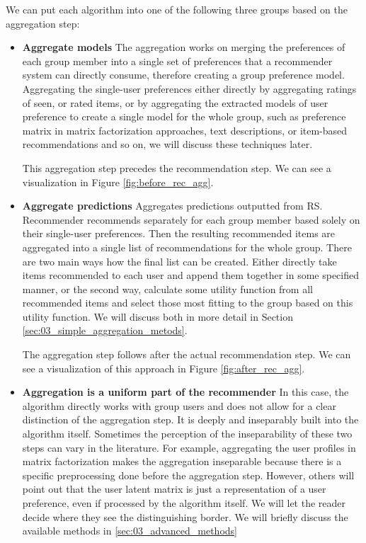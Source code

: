 We can put each algorithm into one of the following three groups based on the aggregation step:
\begin{itemize}
    \item \textbf{Aggregate models} \newline
    The aggregation works on merging the preferences of each group member into a single set of preferences that a recommender system can directly consume, therefore creating a group preference model. Aggregating the single-user preferences either directly by aggregating ratings of seen, or rated items, or by aggregating the extracted models of user preference to create a single model for the whole group, such as preference matrix in matrix factorization approaches, text descriptions, or item-based recommendations and so on, we will discuss these techniques later.
    
    
    This aggregation step precedes the recommendation step. We can see a visualization in Figure \ref{fig:before_rec_agg}.
    
    
    \item \textbf{Aggregate predictions} \newline
     Aggregates predictions outputted from RS. Recommender recommends separately for each group member based solely on their single-user preferences. Then the resulting recommended items are aggregated into a single list of recommendations for the whole group. There are two main ways how the final list can be created. Either directly take items recommended to each user and append them together in some specified manner, or the second way, calculate some utility function from all recommended items and select those most fitting to the group based on this utility function. We will discuss both in more detail in Section \ref{sec:03_simple_aggregation_metods}.
     
     The aggregation step follows after the actual recommendation step. We can see a visualization of this approach in Figure \ref{fig:after_rec_agg}.
     
    \item \textbf{Aggregation is a uniform part of the recommender} \newline
    In this case, the algorithm directly works with group users and does not allow for a clear distinction of the aggregation step. It is deeply and inseparably built into the algorithm itself. Sometimes the perception of the inseparability of these two steps can vary in the literature. For example, aggregating the user profiles in matrix factorization makes the aggregation inseparable because there is a specific preprocessing done before the aggregation step. However, others will point out that the user latent matrix is just a representation of a user preference, even if processed by the algorithm itself. We will let the reader decide where they see the distinguishing border. We will briefly discuss the available methods in \ref{sec:03_advanced_methods}
\end{itemize}


